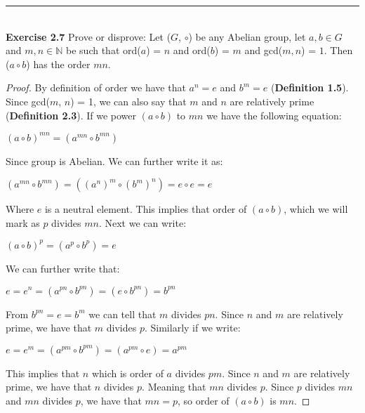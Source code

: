\documentclass[a4paper]{article}
\begin{document}
\noindent\rule{12cm}{0.4pt}\\
\noindent \textbf{Exercise 2.7} Prove or disprove: Let ($G$, $\circ$) be any Abelian group, let $a, b \in G$ and $m,n \in \mathbb{N}$ be such that ord($a$) = $n$ and ord($b$) = $m$ and gcd($m,n$) = $1$. Then ($a \circ b$) has the order $mn$.
\begin{proof}
By definition of order we have that $a^n=e$ and $b^m=e$ (\textbf{Definition 1.5}). Since gcd($m$, $n$) = 1, we can also say that $m$ and $n$ are relatively prime (\textbf{Definition 2.3}). If we power $(a \circ b)$ to $mn$ we have the following equation:
\begin{center}
$(a \circ b)^{mn}=(a^{mn} \circ b^{mn})$
\end{center}
Since group is Abelian. We can further write it as:
\begin{center}
$(a^{mn} \circ b^{mn})=((a^n)^m \circ (b^m)^n)=e \circ e=e$
\end{center}
Where $e$ is a neutral element. This implies that order of $(a \circ b)$, which we will mark as $p$ divides $mn$. Next we can write:
\begin{center}
$(a \circ b)^p=(a^{p} \circ b^{p})=e$
\end{center}
We can further write that:
\begin{center}
$e=e^n=(a^{pn} \circ b^{pn})= (e \circ b^{pn}) =b^{pn}$
\end{center}
From $b^{pn}=e=b^m$ we can tell that $m$ divides $pn$. Since $n$ and $m$ are relatively prime, we have that $m$ divides $p$. Similarly if we write:
\begin{center}
$e = e^m=(a^{pm} \circ b^{pm})= (a^{pm} \circ e) =a^{pm}$
\end{center}
This implies that $n$ which is order of $a$ divides $pm$. Since $n$ and $m$ are relatively prime, we have that $n$ divides $p$. Meaning that $mn$ divides $p$. Since $p$ divides $mn$ and $mn$ divides $p$, we have that $mn=p$, so order of $(a \circ b)$ is $mn$.
\end{proof}
\end{document}
